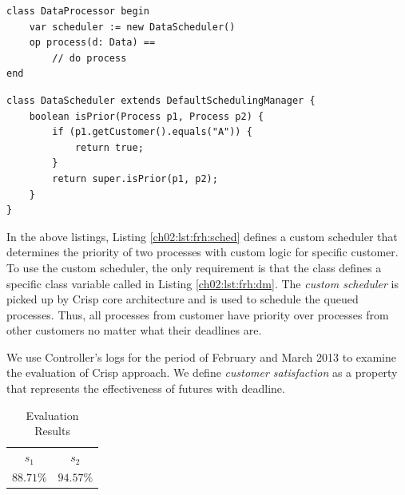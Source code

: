 \begin{center}
\begin{minipage}[t]{0.48\textwidth}
\begin{lstlisting}[label=lst:frh:dm, caption=Data Processor class]
class DataProcessor begin
	var scheduler := new DataScheduler()
	op process(d: Data) ==
		// do process
end
\end{lstlisting}
\end{minipage}
\hfill
\begin{minipage}[t]{0.48\textwidth}
\begin{lstlisting}[label=lst:frh:sched, caption=Custom scheduler]
class DataScheduler extends DefaultSchedulingManager {
	boolean isPrior(Process p1, Process p2) {
		if (p1.getCustomer().equals("A")) {
			return true;
		}
		return super.isPrior(p1, p2);
	}
}
\end{lstlisting}
\end{minipage}
\end{center}

In the above listings, Listing \ref{ch02:lst:frh:sched} defines a custom scheduler that determines the priority of two processes with custom logic for specific customer.
To use the custom scheduler, the only requirement is that the class  defines a specific class variable called  in Listing \ref{ch02:lst:frh:dm}.
The \textsl{custom scheduler} is picked up by Crisp core architecture and is used to schedule the queued processes.
Thus, all processes from customer  have priority over processes from other customers no matter what their deadlines are.

We use Controller's logs for the period of February and March 2013 to examine the evaluation of Crisp approach.
We define \emph{customer satisfaction} as a property that represents the effectiveness of futures with deadline.

\begin{table}[h]
\begin{tabular}{c c}\thickhline
$s_1$ & $s_2$ \\ \thickhline
$88.71\%$ & $94.57\%$ \\ \hline
\end{tabular}
\caption{Evaluation Results}
\label{ch02:tbl:eval}
\end{table}

